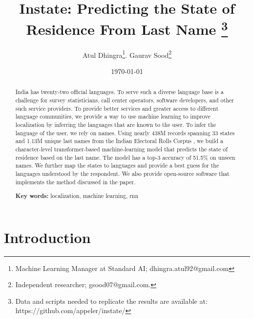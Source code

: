 \documentclass[11pt,  letterpaper]{article}
\title{Instate: Predicting the State of Residence From Last Name
\thanks{Data and scripts needed to replicate the results are available at: https://github.com/appeler/instate/}}
\author{Atul Dhingra\thanks{Machine Learning Manager at Standard AI; \textsf{dhingra.atul92@gmail.com}}.
Gaurav Sood\thanks{Independent researcher;  \textsf{gsood07@gmail.com}.}}
\date{\today}
\begin{document}
\maketitle

\begin{abstract}

India has twenty-two official languages. To serve such a diverse language base is a challenge for survey statisticians, call center operators, software developers, and other such service providers. To provide better services and greater access to different language communities, we provide a way to use machine learning to improve localization by inferring the languages that are known to the user. To infer the language of the user, we rely on names. Using nearly 438M records spanning 33 states and 1.13M unique last names from the Indian Electoral Rolls Corpus \citep{DVN/OG47IV_2023}, we build a character-level transformer-based machine-learning model that predicts the state of residence based on the last name. The model has a top-3 accuracy of 51.5\%  on unseen names. We further map the states to languages and provide a best guess for the languages understood by the respondent. We also provide open-source software that implements the method discussed in the paper.

\smallskip

\textbf{Key words:} localization, machine learning, rnn

\end{abstract}




\section{Introduction}
\end{document}
